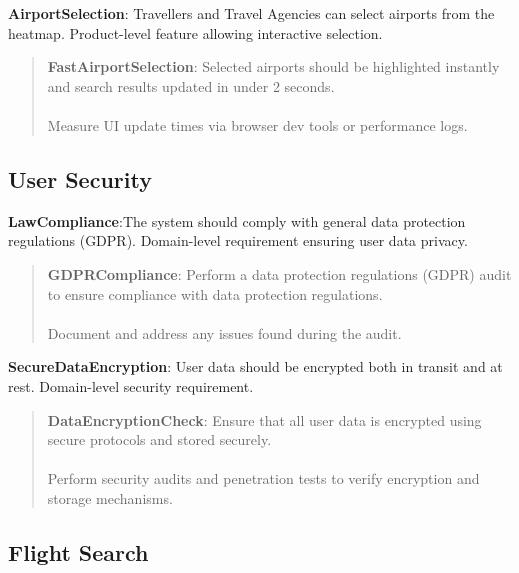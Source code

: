 \textbf{AirportSelection}: Travellers and Travel Agencies can select airports from the heatmap. Product-level feature allowing interactive selection.
\begin{quote}
    \textbf{FastAirportSelection}: Selected airports should be highlighted instantly and search results updated in under 2 seconds. \\ \\ 
    Measure UI update times via browser dev tools or performance logs.
\end{quote}

\subsection{User Security}
\textbf{LawCompliance}:The system should comply with general data protection regulations (GDPR). Domain-level requirement ensuring user data privacy.
\begin{quote}
    \textbf{GDPRCompliance}: Perform a data protection regulations (GDPR) audit to ensure compliance with data protection regulations. \\ \\
    Document and address any issues found during the audit.
\end{quote}
\textbf{SecureDataEncryption}: User data should be encrypted both in transit and at rest. Domain-level security requirement.
\begin{quote}
    \textbf{DataEncryptionCheck}: Ensure that all user data is encrypted using secure protocols and stored securely. \\ \\
    Perform security audits and penetration tests to verify encryption and storage mechanisms.
\end{quote}

\subsection{Flight Search}

